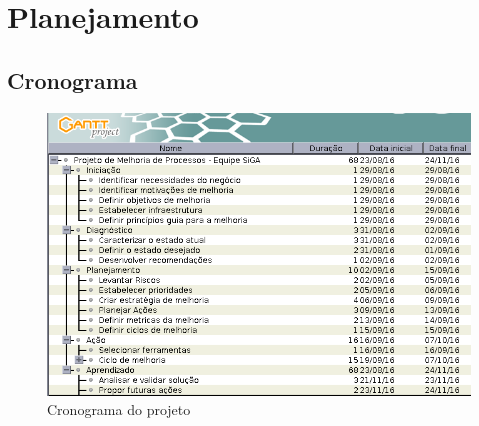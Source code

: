 \chapter{Planejamento}

\section{Cronograma}

\begin{figure}[!ht]
\centering
\includegraphics[scale=0.8]{figuras/cronograma.png}
\caption{Cronograma do projeto}
\label{fig:cronograma}
\end{figure}
